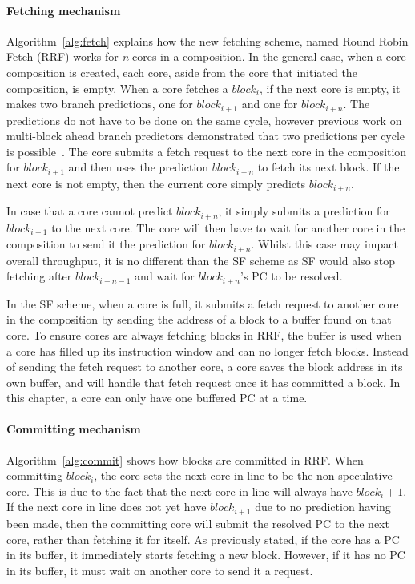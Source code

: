 \paragraph*{Fetching mechanism}
Algorithm~\ref{alg:fetch} explains how the new fetching scheme, named Round Robin Fetch (RRF) works for \textit{n} cores in a composition.
In the general case, when a core composition is created, each core, aside from the core that initiated the composition, is empty.
When a core fetches a $block_i$, if the next core is empty, it makes two branch predictions, one for $block_{i+1}$ and one for $block_{i+n}$.
The predictions do not have to be done on the same cycle, however previous work on multi-block ahead branch predictors demonstrated that two predictions per cycle is possible~\cite{SeznecMultipleBlock}.
The core submits a fetch request to the next core in the composition for $block_{i+1}$ and then uses the prediction $block_{i+n}$ to fetch its next block.
If the next core is not empty, then the current core simply predicts $block_{i+n}$.

In case that a core cannot predict $block_{i+n}$, it simply submits a prediction for $block_{i+1}$ to the next core.
The core will then have to wait for another core in the composition to send it the prediction for $block_{i+n}$.
Whilst this case may impact overall throughput, it is no different than the SF scheme as SF would also stop fetching after $block_{i+n-1}$ and wait for $block_{i+n}$'s PC to be resolved.

In the SF scheme, when a core is full, it submits a fetch request to another core in the composition by sending the address of a block to a buffer found on that core.
To ensure cores are always fetching blocks in RRF, the buffer is used when a core has filled up its instruction window and can no longer fetch blocks.
Instead of sending the fetch request to another core, a core saves the block address in its own buffer, and will handle that fetch request once it has committed a block.
In this chapter, a core can only have one buffered PC at a time.
\paragraph*{Committing mechanism}
Algorithm~\ref{alg:commit} shows how blocks are committed in RRF.
When committing $block_i$, the core sets the next core in line to be the non-speculative core.
This is due to the fact that the next core in line will always have $block_i+1$.
If the next core in line does not yet have $block_{i+1}$ due to no prediction having been made, then the committing core will submit the resolved PC to the next core, rather than fetching it for itself.
As previously stated, if the core has a PC in its buffer, it immediately starts fetching a new block.
However, if it has no PC in its buffer, it must wait on another core to send it a request.
